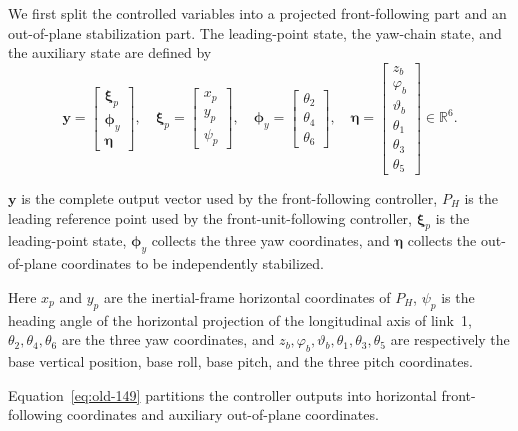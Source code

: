 \documentclass[12pt,a4paper]{report}
\newcommand{\newsymbols}[1]{\par\noindent{}#1\par\vspace{0.35em}}
\newcommand{\formulaannotation}[1]{\par\noindent{}#1\par\vspace{0.35em}}
\begin{document}
We first split the controlled variables into a projected front-following part and an out-of-plane stabilization part. The leading-point state, the yaw-chain state, and the auxiliary state are defined by
\begin{equation}
\mathbf{y} =
\begin{bmatrix}
\boldsymbol{\xi}_p \\
\boldsymbol{\phi}_y \\
\boldsymbol{\eta}
\end{bmatrix},
\quad
\boldsymbol{\xi}_p =
\begin{bmatrix}
x_p \\
y_p \\
\psi_p
\end{bmatrix},
\quad
\boldsymbol{\phi}_y =
\begin{bmatrix}
\theta_{2} \\
\theta_{4} \\
\theta_{6}
\end{bmatrix},
\quad
\boldsymbol{\eta} =
\begin{bmatrix}
z_b \\
\varphi_b \\
\vartheta_b \\
\theta_{1} \\
\theta_{3} \\
\theta_{5}
\end{bmatrix}
\in \mathbb{R}^{6}.
\label{eq:old-149}
\end{equation}
\newsymbols{$\mathbf{y}$ is the complete output vector used by the front-following controller, $P_H$ is the leading reference point used by the front-unit-following controller, $\boldsymbol{\xi}_p$ is the leading-point state, $\boldsymbol{\phi}_y$ collects the three yaw coordinates, and $\boldsymbol{\eta}$ collects the out-of-plane coordinates to be independently stabilized.}
\noindent
Here $x_p$ and $y_p$ are the inertial-frame horizontal coordinates of $P_H$, $\psi_p$ is the heading angle of the horizontal projection of the longitudinal axis of link~1, $\theta_{2},\theta_{4},\theta_{6}$ are the three yaw coordinates, and $z_b,\varphi_b,\vartheta_b,\theta_{1},\theta_{3},\theta_{5}$ are respectively the base vertical position, base roll, base pitch, and the three pitch coordinates.
\formulaannotation{Equation~\eqref{eq:old-149} partitions the controller outputs into horizontal front-following coordinates and auxiliary out-of-plane coordinates.}
\end{document}
